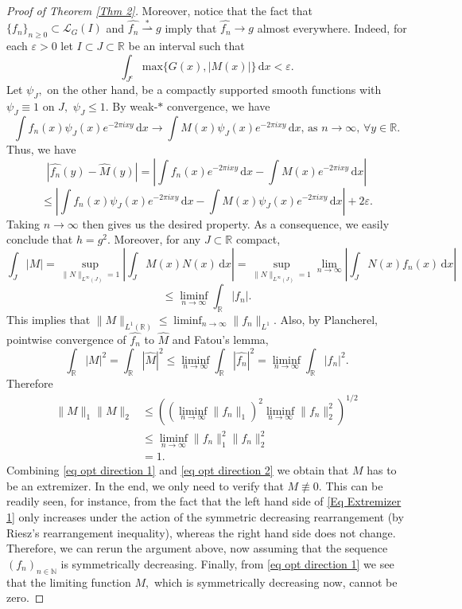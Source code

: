 \documentclass[11pt, reqno]{amsart}
\newcommand{\mmd}{ \mathrm{d}}
\numberwithin{equation}{section}
\newcommand{\R}{{\mathbb R}}
\newcommand{\N}{{\mathbb N}}
\begin{document}
\begin{proof}[Proof of Theorem \ref{Thm 2}]
Moreover, notice that the fact that $\{f_n\}_{n \ge 0} \subset \mathcal{L}_G(I)$ and $\widehat{f_n} \overset{\ast}{\rightharpoonup} g$ imply that $\widehat{f_n} \to g$ almost everywhere. Indeed, for each $\varepsilon > 0$ let $I \subset J \subset \R$ be an interval
such that 
$$\int_{J^{c}} \text{max}\{G(x),|M(x)|\} \, \mmd x < \varepsilon.$$
Let $\psi_J,$ on the other hand, be a compactly supported smooth functions with $\psi_J \equiv 1$ on $J,$ $\psi_J \le 1.$ By weak-$*$ convergence, we have
\[
\int f_n(x) \psi_J(x) e^{-2 \pi i x y} \, \mmd x \to \int M(x) \psi_J(x) e^{-2 \pi i x y} \, \mmd x, \, \text{as } n \to \infty, \, \forall y \in \R.
\]
Thus, we have 
\[
|\widehat{f_n}(y) - \widehat{M}(y)| = \left|\int f_n(x) e^{-2 \pi i x y} \, \mmd x - \int M(x) e^{-2 \pi i x y} \, \mmd x \right| 
\]
\[
\le \left| \int f_n(x) \psi_J(x) e^{-2 \pi i x y} \, \mmd x - \int M(x) \psi_J(x) e^{-2 \pi i x y} \, \mmd x\right| + 2 \varepsilon.
\]
Taking $n \to \infty$ then gives us the desired property. As a consequence, we easily conclude that $h = g^2.$ Moreover, for any $J \subset \R$ compact,
$$
\int_{J}|M| = \sup_{\|N\|_{L^{\infty}(J)} = 1} \left| \int_{J} M(x) N(x) \, \mmd x \right| = \sup_{\|N\|_{L^{\infty}(J)} = 1} \lim_{n \to \infty}\left| \int_{J} N(x) f_n(x) \, \mmd x \right|
$$
$$
\le \liminf_{n\to\infty}\int_{\R} |f_n|.
$$
This implies that $\|M\|_{L^1(\R)} \le \liminf_{n \to \infty} \|f_n\|_{L^1}$. Also, by Plancherel, pointwise convergence of $\widehat{f_n}$ to $\widehat{M}$ and Fatou's lemma,
$$
\int_{\R}|M|^{2} = \int_{\R} |\widehat{M}|^2 \leq \liminf_{n\to\infty}\int_{\R} |\widehat{f_n}|^2 = \liminf_{n \to \infty} \int_{\R} |f_n|^2.
$$
Therefore
\begin{align}\label{eq opt direction 2}
\|M\|_{1}\|M\|_{2}&\leq ((\liminf_{n\to\infty}\|f_n\|_1)^{2}\liminf_{n\to\infty} \|f_n\|_{2}^2)^{1/2}\nonumber\\
&\leq \liminf_{n\to\infty} \|f_n\|^{2}_1\|f_n\|^{2}_2\nonumber\\
&=1. 
\end{align}
Combining \eqref{eq opt direction 1} and \eqref{eq opt direction 2} we obtain that $M$ has to be an extremizer. In the end, we only need to verify that $M \not\equiv 0.$ This can be readily seen, for 
instance, from the fact that the left hand side of \eqref{Eq Extremizer 1} only increases under the action of the symmetric decreasing 
rearrangement (by Riesz's rearrangement inequality), whereas the right hand side does not change. Therefore, we can rerun the argument above, now assuming that the sequence $(f_n)_{n \in \N}$ is symmetrically decreasing.
Finally, from \eqref{eq opt direction 1} we see that the limiting function $M,$ which is symmetrically decreasing now, cannot be zero. 

\end{proof}
\end{document}
